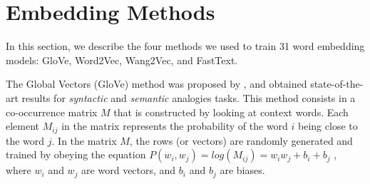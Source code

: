 \section{Embedding Methods}

In this section, we describe the four methods we used to train 31 word embedding models: GloVe, Word2Vec, Wang2Vec, and FastText.




The Global Vectors (GloVe) method was proposed by \cite{penningtonetal2014}, and obtained state-of-the-art results for \emph{syntactic} and \emph{semantic} analogies tasks. This method consists in a co-occurrence matrix $M$ that is constructed by looking at context words. Each element $M_{ij}$ in the matrix represents the probability of the word $i$ being close to the word $j$. In the matrix $M$, the rows (or vectors) are randomly generated and trained by obeying the equation $P(w_i, w_j) = log(M_{ij}) = w_iw_j + b_i + b_j$
, where $w_i$ and $w_j$ are word vectors, and $b_i$ and $b_j$ are biases.







